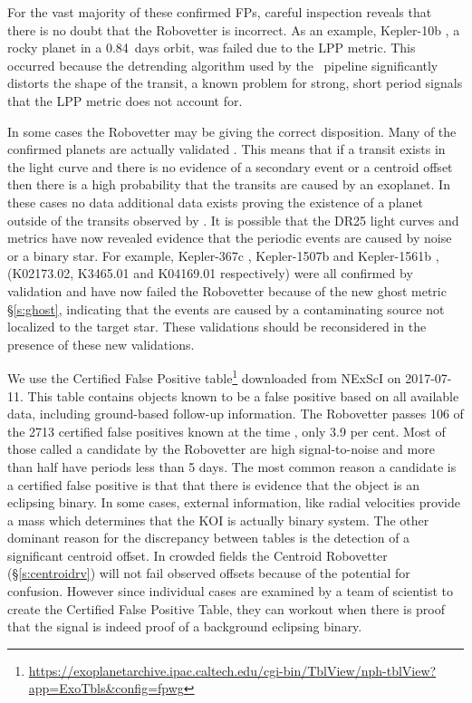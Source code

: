 For the vast majority of these confirmed FPs, careful inspection reveals that there is no doubt that the Robovetter is incorrect. As an example, Kepler-10b \citep[][]{Batalha2011Kepler10,Fogtmann2014Kepler10}, a rocky planet in a 0.84~days orbit, was failed due to the LPP metric. This occurred because the detrending algorithm used by the \Kepler\ pipeline significantly distorts the shape of the transit, a known problem for strong, short period signals that the LPP metric does not account for.

In some cases the Robovetter may be giving the correct disposition.  Many of the confirmed planets are actually validated \citep{Morton2016,Rowe2014}. This means that if a transit exists in the light curve and there is no evidence of a secondary event or a centroid offset then there is a high probability that the transits are caused by an exoplanet. In these cases no data additional data exists proving the existence of a planet outside of the transits observed by \Kepler. It is possible that the DR25 light curves and metrics have now revealed evidence that the periodic events are caused by noise or a binary star. For example, Kepler-367c \citep{Rowe2014}, Kepler-1507b \citep{Morton2016} and Kepler-1561b \citep{Morton2016}, (K02173.02, K3465.01 and K04169.01 respectively) were all confirmed by validation and have now failed the Robovetter because of the new ghost metric \S\ref{s:ghost}, indicating that the events are caused by a contaminating source not localized to the target star.  These validations should be reconsidered in the presence of these new validations.


We use the Certified False Positive table\footnote{\url{https://exoplanetarchive.ipac.caltech.edu/cgi-bin/TblView/nph-tblView?app=ExoTbls\&config=fpwg}} downloaded from NExScI on 2017-07-11. This table contains objects known to be a false positive based on all available data, including ground-based follow-up information.  The Robovetter passes 106 of the 2713 certified false positives known at the time , only 3.9 per cent.  Most of those called a candidate by the Robovetter are high signal-to-noise and more than half have periods less than 5 days. The most common reason a candidate is a certified false positive is that that there is evidence that the object is an eclipsing binary. In some cases, external information, like radial velocities provide a mass which determines that the KOI is actually binary system. The other dominant reason for the discrepancy between tables is the detection of a significant centroid offset. In crowded fields the Centroid Robovetter (\S\ref{s:centroidrv}) will not fail observed offsets because of the potential for confusion. However since individual cases are examined by a team of scientist to create the Certified False Positive Table, they can workout when there is proof that the signal is indeed proof of a background eclipsing binary.  

